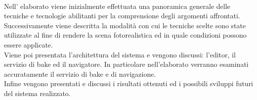 \\
Nell' elaborato viene inizialmente effettuata una panoramica generale delle tecniche e tecnologie abilitanti per la comprensione degli argomenti affrontati.
\\
Successivamente viene descritta la modalità con cui le tecniche scelte sono state utilizzate al fine di rendere la scena fotorealistica ed in quale condizioni possono essere applicate.
\\
Viene poi presentata l’architettura del sistema e vengono discussi: l’editor, il servizio di bake ed il navigatore. In particolare nell’elaborato verranno esaminati accuratamente il servizio di bake e di navigazione.
\\
Infine vengono presentati e discussi i risultati ottenuti ed i possibili sviluppi futuri del sistema realizzato.

